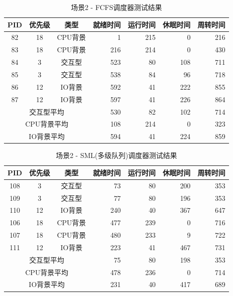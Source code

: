 \documentclass[a4paper, 12pt]{article}
\begin{document}
\begin{table}[H]
	\centering
	\caption{场景2 - FCFS调度器测试结果}
	\begin{tabular}{cccrrrr}
		\toprule
		\textbf{PID} & \textbf{优先级} & \textbf{类型} & \textbf{就绪时间} & \textbf{运行时间} & \textbf{休眠时间} & \textbf{周转时间} \\
		\midrule
		82 & 18 & CPU背景 & 1 & 215 & 0 & 216 \\
		83 & 18 & CPU背景 & 216 & 214 & 0 & 430 \\
		84 & 3 & 交互型 & 523 & 80 & 108 & 711 \\
		85 & 3 & 交互型 & 538 & 84 & 96 & 718 \\
		86 & 12 & IO背景 & 592 & 41 & 222 & 855 \\
		87 & 12 & IO背景 & 597 & 41 & 226 & 864 \\
		\midrule
		\multicolumn{3}{c}{交互型平均} & 530 & 82 & 102 & 714 \\
		\multicolumn{3}{c}{CPU背景平均} & 108 & 214 & 0 & 323 \\
		\multicolumn{3}{c}{IO背景平均} & 594 & 41 & 224 & 859 \\
		\bottomrule
	\end{tabular}
\end{table}

\begin{table}[H]
	\centering
	\caption{场景2 - SML(多级队列)调度器测试结果}
	\begin{tabular}{cccrrrr}
		\toprule
		\textbf{PID} & \textbf{优先级} & \textbf{类型} & \textbf{就绪时间} & \textbf{运行时间} & \textbf{休眠时间} & \textbf{周转时间} \\
		\midrule
		108 & 3 & 交互型 & 73 & 80 & 200 & 353 \\
		109 & 3 & 交互型 & 77 & 80 & 196 & 353 \\
		110 & 12 & IO背景 & 240 & 40 & 367 & 647 \\
		106 & 18 & CPU背景 & 477 & 239 & 0 & 716 \\
		107 & 18 & CPU背景 & 480 & 233 & 9 & 722 \\
		111 & 12 & IO背景 & 223 & 41 & 467 & 731 \\
		\midrule
		\multicolumn{3}{c}{交互型平均} & 75 & 80 & 198 & 353 \\
		\multicolumn{3}{c}{CPU背景平均} & 478 & 236 & 0 & 714 \\
		\multicolumn{3}{c}{IO背景平均} & 231 & 40 & 417 & 689 \\
		\bottomrule
	\end{tabular}
\end{table}
\end{document}
